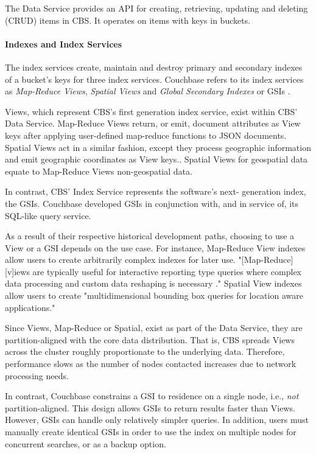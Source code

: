 \documentclass[9pt,twocolumn,twoside]{../../styles/osajnl}
\begin{document}
The Data Service provides an API for creating, retrieving, updating and deleting (CRUD) items in CBS.  It operates on items with keys in buckets.

\paragraph{Indexes and Index Services} The index services create, maintain and destroy primary and secondary indexes of a bucket's keys for three index services.  Couchbase refers to its index services as \textit{Map-Reduce Views},  \textit{Spatial Views} and \textit{Global Secondary Indexes} or GSIs \cite{www-viewsindexing-cbsinc}.  

Views, which represent CBS's first generation index service, exist within CBS' Data Service.  Map-Reduce Views return, or emit, document attributes as View keys after applying user-defined map-reduce functions to JSON documents. Spatial Views act in a similar fashion, except they process geographic information and emit geographic coordinates as View keys.\cite{www-queries-cbsinc}.  Spatial Views for geospatial data equate to Map-Reduce Views non-geospatial data.

In contrast, CBS' Index Service represents the software's next-
generation index, the GSIs.  Couchbase developed GSIs in conjunction with, and in service of, its SQL-like query service.

As a result of their respective historical development paths, choosing to use a View or a GSI depends on the use case. For instance, Map-Reduce View indexes allow users to create arbitrarily complex indexes for later use.  "[Map-Reduce][v]iews are typically useful for interactive reporting type queries where complex data processing and custom data reshaping is necessary \cite{www-viewsindexing-cbsinc}." Spatial View indexes allow users to create "multidimensional bounding box queries for location aware applications." \cite{www-viewsindexing-cbsinc}

Since Views, Map-Reduce or Spatial, exist as part of the Data Service, they are partition-aligned with the core data distribution.  That is, CBS spreads Views across the cluster roughly proportionate to the underlying data.  Therefore, performance slows as the number of nodes contacted increases due to network processing needs.

In contrast, Couchbase constrains a GSI to residence on a single node, i.e., \textit{not} partition-aligned.  This design allows GSIs to return results faster than Views.  However, GSIs can handle only relatively simpler queries.  In addition, users must manually create identical GSIs in order to use the index on multiple nodes for concurrent searches, or as a backup option.
\end{document}
